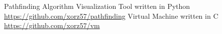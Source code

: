 
\begin{cventries}
    \cventryiv
        {Pathfinding Algorithm Visualization Tool written in Python}
        {}
        {\url{https://github.com/xorz57/pathfinding}}
        {}
    \cventryiv
        {Virtual Machine written in C}
        {}
        {\url{https://github.com/xorz57/vm}}
        {}
\end{cventries}
